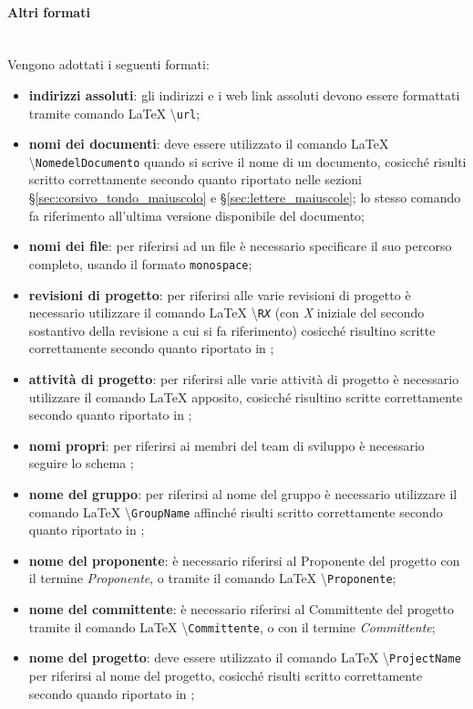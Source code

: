 \paragraph{Altri formati} \mbox{} \\
Vengono adottati i seguenti formati:
\begin{itemize}
	\item \textbf{indirizzi assoluti}: gli indirizzi \email{} e i web link assoluti devono essere formattati tramite comando \LaTeX{} \textbackslash{\texttt{url}};
	\item \textbf{nomi dei documenti}: deve essere utilizzato il comando \LaTeX{} \textbackslash{\texttt{NomedelDocumento}} quando si scrive il nome di un documento, cosicché risulti scritto correttamente secondo quanto riportato nelle sezioni §\ref{sec:corsivo_tondo_maiuscolo} e §\ref{sec:lettere_maiuscole}; lo stesso comando fa riferimento all'ultima versione disponibile del documento;
	\item \textbf{nomi dei file}: per riferirsi ad un file è necessario specificare il suo percorso completo, usando il formato \texttt{monospace};
	\item \textbf{revisioni di progetto}: per riferirsi alle varie revisioni di progetto è necessario utilizzare il comando \LaTeX{} \textbackslash{\texttt{R\textit{X}}} (con \textit{X} iniziale del secondo sostantivo della revisione a cui si fa riferimento) cosicché risultino scritte correttamente secondo quanto riportato in ;
	\item \textbf{attività di progetto}: per riferirsi alle varie attività di progetto è necessario utilizzare il comando \LaTeX{} apposito, cosicché risultino scritte correttamente secondo quanto riportato in ;
	\item \textbf{nomi propri}: per riferirsi ai membri del team di sviluppo è necessario seguire lo schema ;
	\item \textbf{nome del gruppo}: per riferirsi al nome del gruppo è necessario utilizzare il comando \LaTeX{} \textbackslash{\texttt{GroupName}} affinché risulti scritto correttamente secondo quanto riportato in ;
	\item \textbf{nome del proponente}: è necessario riferirsi al Proponente del progetto con il termine \textit{Proponente}, o tramite il comando \LaTeX{} \textbackslash{\texttt{Proponente}};
	\item \textbf{nome del committente}: è necessario riferirsi al Committente del progetto tramite il comando \LaTeX{} \textbackslash{\texttt{Committente}}, o con il termine \textit{Committente};
	\item \textbf{nome del progetto}: deve essere utilizzato il comando \LaTeX{} \textbackslash{\texttt{ProjectName}} per riferirsi al nome del progetto, cosicché risulti scritto correttamente secondo quando riportato in ;
\end{itemize}

